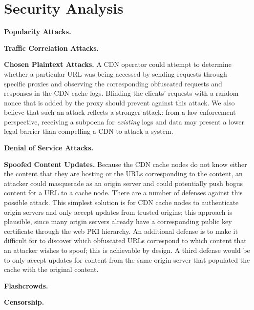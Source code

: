 \section{Security Analysis}
\label{sec:sec}

{\bf Popularity Attacks.}

{\bf Traffic Correlation Attacks.}

{\bf Chosen Plaintext Attacks.} A CDN operator could attempt to
determine whether a particular URL was being accessed by sending requests
through specific \system{} proxies and observing the corresponding obfuscated
requests and responses in the CDN cache logs. Blinding the clients' requests
with a random nonce that is added by the proxy should prevent against this
attack. We also believe that such an attack reflects a stronger attack: from a
law enforcement perspective, receiving a subpoena for {\em existing} logs and
data may present a lower legal barrier than compelling a CDN to attack a
system.

{\bf Denial of Service Attacks.}

{\bf Spoofed Content Updates.} Because the CDN cache
nodes do not know either the content that they are hosting or the URLs
corresponding to the content, an attacker could masquerade as an origin server
and could potentially push bogus content for a URL to a cache node. There are
a number of defenses against this possible attack. This simplest solution is
for CDN cache nodes to authenticate origin servers and only accept updates
from trusted origins; this approach is plausible, since many origin servers already
have a corresponding public key certificate through the web PKI hierarchy.  An additional
defense is to make it difficult for to discover which obfuscated URLs correspond
to which content that an attacker wishes to spoof; this is achievable by design.
A third defense would be to only accept updates for content from the same origin
server that populated the cache with the original content.

{\bf Flashcrowds.}

{\bf Censorship.}

